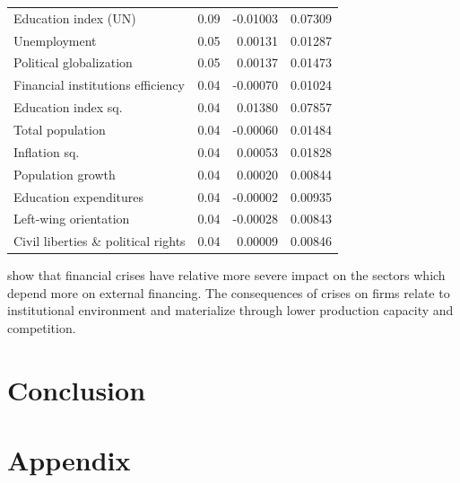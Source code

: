 \begin{refsection}
\begin{table}[htbp!]
\begin{tabular}{lrrr}
  Education index (UN) & 0.09 & -0.01003 & 0.07309 \\ 
  Unemployment & 0.05 & 0.00131 & 0.01287 \\ 
  Political globalization & 0.05 & 0.00137 & 0.01473 \\ 
  Financial institutions efficiency & 0.04 & -0.00070 & 0.01024 \\ 
  Education index sq. & 0.04 & 0.01380 & 0.07857 \\ 
  Total population & 0.04 & -0.00060 & 0.01484 \\ 
  Inflation sq. & 0.04 & 0.00053 & 0.01828 \\ 
  Population growth & 0.04 & 0.00020 & 0.00844 \\
  Education expenditures & 0.04 & -0.00002 & 0.00935 \\ 
  Left-wing orientation & 0.04 & -0.00028 & 0.00843 \\ 
  Civil liberties \& political rights & 0.04 & 0.00009 & 0.00846 \\
    \bottomrule
  \end{tabular}
\end{table}

\textcite{kroszneretal2007} show that financial crises have relative more severe impact on the sectors which depend more on external financing. The consequences of crises on firms relate to institutional environment and materialize through lower production capacity and competition.

\section{Conclusion}
\label{ch4sec:conclusion}

\clearpage
%
%
%
%
%
\printbibliography
{}
%
%
%
%
%
\clearpage
%
\section*{Appendix}
\label{ch4sec:appch2}
\begin{subappendices}

\end{subappendices}
\end{refsection}
